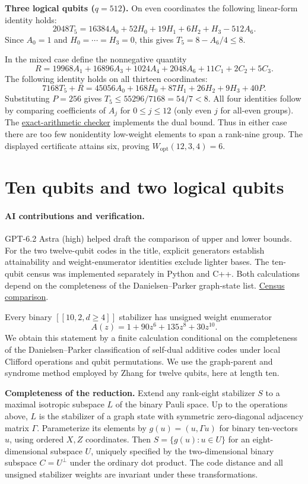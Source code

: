 \documentclass[11pt]{article}
\newcommand{\W}{W_{\mathrm{opt}}}
\begin{document}
\textbf{Three logical qubits ($q=512$).} On even coordinates the following linear-form identity holds:
\[
 2048T_5=16384A_0+52H_0+19H_1+6H_2+H_3-512A_6.
\]
Since $A_0=1$ and $H_0=\cdots=H_3=0$, this gives $T_5=8-A_6/4\le8$.

In the mixed case define the nonnegative quantity
\[
 R=19968A_1+16896A_3+1024A_4+2048A_6+11C_1+2C_2+5C_3.
\]
The following identity holds on all thirteen coordinates:
\[
 7168T_5+R=45056A_0+168H_0+87H_1+26H_2+9H_3+40P .
\]
Substituting $P=256$ gives $T_5\le 55296/7168=54/7<8$. All four identities follow by comparing coefficients of $A_j$ for $0\le j\le12$ (only even $j$ for all-even groups). The \href{https://github.com/shunyaekam/oo-research/blob/research/checks/small_qec/dual.py}{exact-arithmetic checker} implements the dual bound. Thus in either case there are too few nonidentity low-weight elements to span a rank-nine group. The displayed certificate attains six, proving $\W(12,3,4)=6$.

\section*{Ten qubits and two logical qubits}
\paragraph{AI contributions and verification.} GPT-6.2 Astra (high) helped draft the comparison of upper and lower bounds. For the two twelve-qubit codes in the title, explicit generators establish attainability and weight-enumerator identities exclude lighter bases. The ten-qubit census was implemented separately in Python and C++. Both calculations depend on the completeness of the Danielsen--Parker graph-state list. \href{https://github.com/shunyaekam/oo-research/blob/a5cde30636afbfe599efab6bf8bbbafe9c640c22/checks/small_qec/census10/review.md}{Census comparison}.

Every binary $[[10,2,d\ge4]]$ stabilizer has unsigned weight enumerator
\[
 A(z)=1+90z^6+135z^8+30z^{10}.
\]
We obtain this statement by a finite calculation conditional on the completeness of the Danielsen--Parker classification of self-dual additive codes under local Clifford operations and qubit permutations. We use the graph-parent and syndrome method employed by Zhang for twelve qubits, here at length ten.

\textbf{Completeness of the reduction.} Extend any rank-eight stabilizer $S$ to a maximal isotropic subspace $L$ of the binary Pauli space. Up to the operations above, $L$ is the stabilizer of a graph state with symmetric zero-diagonal adjacency matrix $\Gamma$. Parameterize its elements by $g(u)=(u,\Gamma u)$ for binary ten-vectors $u$, using ordered $X,Z$ coordinates. Then $S=\{g(u):u\in U\}$ for an eight-dimensional subspace $U$, uniquely specified by the two-dimensional binary subspace $C=U^\perp$ under the ordinary dot product. The code distance and all unsigned stabilizer weights are invariant under these transformations.
\end{document}
